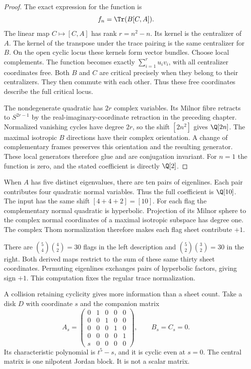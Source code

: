 \begin{proof}
The exact expression for the function is
\[
                         f_n=\Tr(B[C,A]).
\]
The linear map $C\mapsto[C,A]$ has rank $r=n^2-n$.
Its kernel is the centralizer of $A$. The kernel of the transpose
under the trace pairing is the same centralizer for $B$.
On the open cyclic locus these kernels form vector bundles.
Choose local complements. The function becomes exactly
$\sum_{i=1}^r u_i v_i$, with all centralizer coordinates free.
Both $B$ and $C$ are critical precisely when they belong to their
centralizers. They then commute with each other. Thus these free
coordinates describe the full critical locus.

The nondegenerate quadratic has $2r$ complex variables. Its Milnor
fibre retracts to $S^{2r-1}$ by the real-imaginary-coordinate
retraction in the preceding chapter. Normalized vanishing cycles
have degree $2r$, so the shift $[2n^2]$ gives $\Q[2n]$.
The maximal isotropic $B$ directions have their complex orientation.
A change of complementary frames preserves this orientation and
the resulting generator. These local generators therefore glue
and are conjugation invariant. For $n=1$ the function is zero,
and the stated coefficient is directly $\Q[2]$.
\end{proof}

When $A$ has five distinct eigenvalues, there are ten pairs of
eigenlines. Each pair contributes four quadratic normal variables.
Thus the full coefficient is $\Q[10]$. The input has the same
shift $[4+4+2]=[10]$. For each flag the complementary normal
quadratic is hyperbolic. Projection of its Milnor sphere to the
complex normal coordinates of a maximal isotropic subspace has
degree one. The complex Thom normalization therefore makes each
flag sheet contribute $+1$.

There are $\binom54\binom42=30$ flags in the left description
and $\binom52\binom32=30$ in the right. Both derived maps restrict
to the sum of these same thirty sheet coordinates. Permuting
eigenlines exchanges pairs of hyperbolic factors, giving sign
$+1$. This computation fixes the regular trace normalization.

A collision retaining cyclicity gives more information than a sheet
count. Take a disk $D$ with coordinate $s$ and the companion matrix
\[
 A_s=\begin{pmatrix}
 0&1&0&0&0\\0&0&1&0&0\\0&0&0&1&0\\0&0&0&0&1\\s&0&0&0&0
 \end{pmatrix},\qquad B_s=C_s=0.
\]
Its characteristic polynomial is $t^5-s$, and it is cyclic even
at $s=0$. The central matrix is one nilpotent Jordan block.
It is not a scalar matrix.

